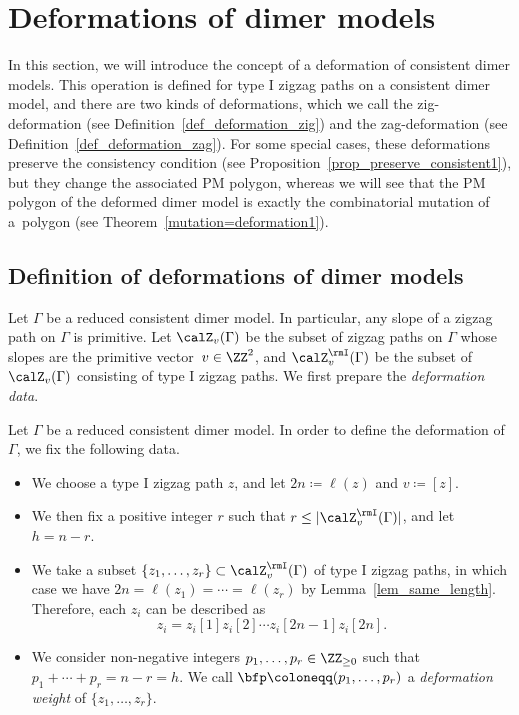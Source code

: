 \section{Deformations of dimer models}\label{sec_def_deform}

In this section, we will introduce the concept of a deformation of consistent dimer models.
This operation is defined for type I zigzag paths on a consistent dimer model, and there are two kinds of deformations,
which we call the zig-deformation (see Definition~\ref{def_deformation_zig}) and the zag-deformation (see Definition~\ref{def_deformation_zag}).
For some special cases, these deformations preserve the consistency condition (see Proposition~\ref{prop_preserve_consistent1}),
but they change the associated PM polygon, whereas we will see that the PM polygon of the deformed dimer model is exactly the combinatorial mutation of a~polygon (see Theorem~\ref{mutation=deformation1}).

\subsection{Definition of deformations of dimer models}\label{subsec_def_deform}

Let $\Gamma$ be a reduced consistent dimer model.
In particular, any slope of a zigzag path on $\Gamma$ is primitive.
Let $\calZ_v(\Gamma)$ be the subset of zigzag paths on $\Gamma$ whose slopes are the primitive vector~$v\in\ZZ^2$,
and $\calZ_v^\rmI(\Gamma)$ be the subset of $\calZ_v(\Gamma)$ consisting of type I zigzag paths.
We first prepare the \emph{deformation data}.

\begin{Definition}\label{def_deformation_data}
Let $\Gamma$ be a reduced consistent dimer model. In order to define the deformation of $\Gamma$, we fix the following data.
\begin{itemize}\itemsep=0pt
\item[(1)] We choose a type I zigzag path $z$, and let $2n\coloneqq\ell(z)$ and $v\coloneqq [z]$.
\item[(2)] We then fix a positive integer $r$ such that $r\le |\calZ_v^\rmI(\Gamma)|$, and let $h=n-r$.
\item[(3)] We take a subset $\{z_1,\dots,z_r\}\subset\calZ_v^\rmI(\Gamma)$ of type I zigzag paths, in which case we have $2n=\ell(z_1)=\cdots=\ell(z_r)$ by Lemma~\ref{lem_same_length}.
Therefore, each $z_i$ can be described as
\begin{displaymath} z_i=z_i[1]z_i[2]\cdots z_i[2n-1]z_i[2n]. \end{displaymath}
\item[(4)]
We consider non-negative integers $p_1,\dots,p_r\in\ZZ_{\ge0}$ such that $p_1+\cdots+p_r=n-r=h$.
We call $\bfp\coloneqq(p_1,\dots,p_r)$ a \emph{deformation weight} of $\{z_1, \dots, z_r\}$.
\end{itemize}
\end{Definition}

